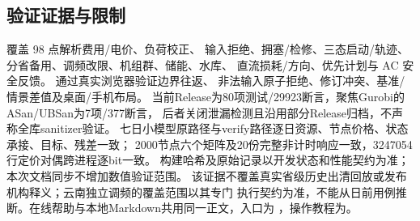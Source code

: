 \subsection{验证证据与限制}
 覆盖 98 点解析费用/电价、负荷校正、
输入拒绝、拥塞/检修、三态启动/轨迹、分省备用、调频改限、机组群、储能、水库、
直流损耗/方向、优先计划与 AC 安全反馈。
 通过真实浏览器验证边界往返、
非法输入原子拒绝、修订冲突、基准/情景差值及桌面/手机布局。
当前Release为80项测试/29923断言，聚焦Gurobi的ASan/UBSan为7项/377断言，
后者关闭泄漏检测且沿用部分Release归档，不声称全库sanitizer验证。
七日小模型原路径与verify路径逐日资源、节点价格、状态承接、目标、残差一致；
2000节点六个矩阵及20份完整非计时响应一致，3247054行定价对偶跨进程逐bit一致。
构建哈希及原始记录以开发状态和性能契约为准；本次文档同步不增加数值验证范围。
该证据不覆盖真实省级历史出清回放或发布机构释义；云南独立调频的覆盖范围以其专门
执行契约为准，不能从日前用例推断。在线帮助与本地Markdown共用同一正文，入口为
，操作教程为。
